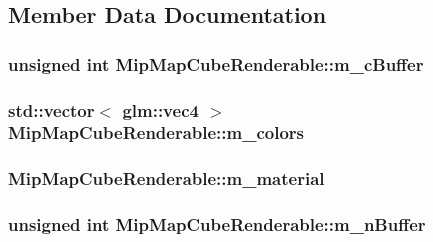 \subsection{Member Data Documentation}
\hypertarget{classMipMapCubeRenderable_a1e9b398ba5e9adbfc80291d6eb64c8f3}{
\subsubsection[{m\+\_\+c\+Buffer}]{\setlength{\rightskip}{0pt plus 5cm}unsigned int Mip\+Map\+Cube\+Renderable\+::m\+\_\+c\+Buffer\hspace{0.3cm}{\ttfamily [private]}}}\label{classMipMapCubeRenderable_a1e9b398ba5e9adbfc80291d6eb64c8f3}
\hypertarget{classMipMapCubeRenderable_a5221f8391c0ef9ad9a4cc5cd0a079463}{
\subsubsection[{m\+\_\+colors}]{\setlength{\rightskip}{0pt plus 5cm}std\+::vector$<$ glm\+::vec4 $>$ Mip\+Map\+Cube\+Renderable\+::m\+\_\+colors\hspace{0.3cm}{\ttfamily [private]}}}\label{classMipMapCubeRenderable_a5221f8391c0ef9ad9a4cc5cd0a079463}
\hypertarget{classMipMapCubeRenderable_a0173b7f4dbc0e7b6cc7e6ef48e05d4a1}{
\subsubsection[{m\+\_\+material}]{ Mip\+Map\+Cube\+Renderable\+::m\+\_\+material\hspace{0.3cm}{\ttfamily [private]}}}\label{classMipMapCubeRenderable_a0173b7f4dbc0e7b6cc7e6ef48e05d4a1}
\hypertarget{classMipMapCubeRenderable_a62a8adc606b023420b2089961499de09}{
\subsubsection[{m\+\_\+n\+Buffer}]{\setlength{\rightskip}{0pt plus 5cm}unsigned int Mip\+Map\+Cube\+Renderable\+::m\+\_\+n\+Buffer\hspace{0.3cm}{\ttfamily [private]}}}\label{classMipMapCubeRenderable_a62a8adc606b023420b2089961499de09}
